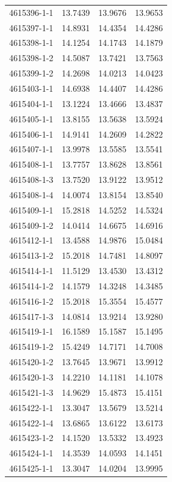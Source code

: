 \begin{longtable}{lrrr}
4615396-1-1 & 13.7439 & 13.9676 & 13.9653 \\
4615397-1-1 & 14.8931 & 14.4354 & 14.4286 \\
4615398-1-1 & 14.1254 & 14.1743 & 14.1879 \\
4615398-1-2 & 14.5087 & 13.7421 & 13.7563 \\
4615399-1-2 & 14.2698 & 14.0213 & 14.0423 \\
4615403-1-1 & 14.6938 & 14.4407 & 14.4286 \\
4615404-1-1 & 13.1224 & 13.4666 & 13.4837 \\
4615405-1-1 & 13.8155 & 13.5638 & 13.5924 \\
4615406-1-1 & 14.9141 & 14.2609 & 14.2822 \\
4615407-1-1 & 13.9978 & 13.5585 & 13.5541 \\
4615408-1-1 & 13.7757 & 13.8628 & 13.8561 \\
4615408-1-3 & 13.7520 & 13.9122 & 13.9512 \\
4615408-1-4 & 14.0074 & 13.8154 & 13.8540 \\
4615409-1-1 & 15.2818 & 14.5252 & 14.5324 \\
4615409-1-2 & 14.0414 & 14.6675 & 14.6916 \\
4615412-1-1 & 13.4588 & 14.9876 & 15.0484 \\
4615413-1-2 & 15.2018 & 14.7481 & 14.8097 \\
4615414-1-1 & 11.5129 & 13.4530 & 13.4312 \\
4615414-1-2 & 14.1579 & 14.3248 & 14.3485 \\
4615416-1-2 & 15.2018 & 15.3554 & 15.4577 \\
4615417-1-3 & 14.0814 & 13.9214 & 13.9280 \\
4615419-1-1 & 16.1589 & 15.1587 & 15.1495 \\
4615419-1-2 & 15.4249 & 14.7171 & 14.7008 \\
4615420-1-2 & 13.7645 & 13.9671 & 13.9912 \\
4615420-1-3 & 14.2210 & 14.1181 & 14.1078 \\
4615421-1-3 & 14.9629 & 15.4873 & 15.4151 \\
4615422-1-1 & 13.3047 & 13.5679 & 13.5214 \\
4615422-1-4 & 13.6865 & 13.6122 & 13.6173 \\
4615423-1-2 & 14.1520 & 13.5332 & 13.4923 \\
4615424-1-1 & 14.3539 & 14.0593 & 14.1451 \\
4615425-1-1 & 13.3047 & 14.0204 & 13.9995 \\

\end{longtable}
